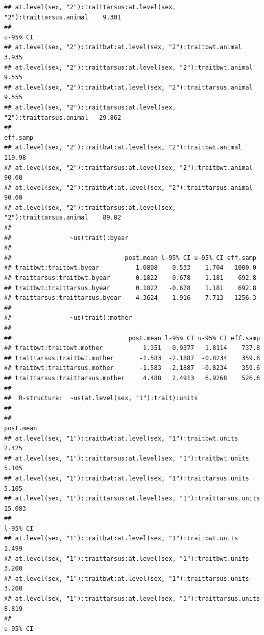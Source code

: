 \documentclass[
  12pt,
]{book}
\begin{document}
\begin{verbatim}
## at.level(sex, "2"):traittarsus:at.level(sex, "2"):traittarsus.animal    9.301
##                                                                      u-95% CI
## at.level(sex, "2"):traitbwt:at.level(sex, "2"):traitbwt.animal          3.935
## at.level(sex, "2"):traittarsus:at.level(sex, "2"):traitbwt.animal       9.555
## at.level(sex, "2"):traitbwt:at.level(sex, "2"):traittarsus.animal       9.555
## at.level(sex, "2"):traittarsus:at.level(sex, "2"):traittarsus.animal   29.862
##                                                                      eff.samp
## at.level(sex, "2"):traitbwt:at.level(sex, "2"):traitbwt.animal         119.98
## at.level(sex, "2"):traittarsus:at.level(sex, "2"):traitbwt.animal       90.60
## at.level(sex, "2"):traitbwt:at.level(sex, "2"):traittarsus.animal       90.60
## at.level(sex, "2"):traittarsus:at.level(sex, "2"):traittarsus.animal    89.82
## 
##                ~us(trait):byear
## 
##                               post.mean l-95% CI u-95% CI eff.samp
## traitbwt:traitbwt.byear          1.0808    0.533    1.704   1000.0
## traittarsus:traitbwt.byear       0.1822   -0.678    1.181    692.8
## traitbwt:traittarsus.byear       0.1822   -0.678    1.181    692.8
## traittarsus:traittarsus.byear    4.3624    1.916    7.713   1256.3
## 
##                ~us(trait):mother
## 
##                                post.mean l-95% CI u-95% CI eff.samp
## traitbwt:traitbwt.mother           1.351   0.9377   1.8114    737.8
## traittarsus:traitbwt.mother       -1.583  -2.1887  -0.8234    359.6
## traitbwt:traittarsus.mother       -1.583  -2.1887  -0.8234    359.6
## traittarsus:traittarsus.mother     4.488   2.4913   6.9268    526.6
## 
##  R-structure:  ~us(at.level(sex, "1"):trait):units
## 
##                                                                     post.mean
## at.level(sex, "1"):traitbwt:at.level(sex, "1"):traitbwt.units           2.425
## at.level(sex, "1"):traittarsus:at.level(sex, "1"):traitbwt.units        5.105
## at.level(sex, "1"):traitbwt:at.level(sex, "1"):traittarsus.units        5.105
## at.level(sex, "1"):traittarsus:at.level(sex, "1"):traittarsus.units    15.083
##                                                                     l-95% CI
## at.level(sex, "1"):traitbwt:at.level(sex, "1"):traitbwt.units          1.499
## at.level(sex, "1"):traittarsus:at.level(sex, "1"):traitbwt.units       3.200
## at.level(sex, "1"):traitbwt:at.level(sex, "1"):traittarsus.units       3.200
## at.level(sex, "1"):traittarsus:at.level(sex, "1"):traittarsus.units    8.819
##                                                                     u-95% CI

\end{verbatim}
\end{document}
